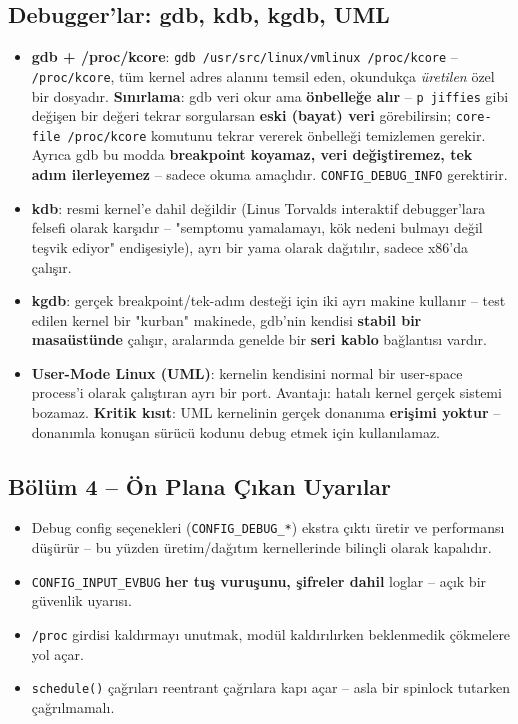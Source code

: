 \documentclass[11pt,a4paper]{article}
\begin{document}
\subsection{Debugger'lar: gdb, kdb, kgdb, UML}

\begin{itemize}[leftmargin=1.2cm]
  \item \textbf{gdb + /proc/kcore}: \texttt{gdb /usr/src/linux/vmlinux
  /proc/kcore} -- \texttt{/proc/kcore}, tüm kernel adres alanını temsil
  eden, okundukça \emph{üretilen} özel bir dosyadır. \textbf{Sınırlama}:
  gdb veri okur ama \textbf{önbelleğe alır} -- \texttt{p jiffies} gibi
  değişen bir değeri tekrar sorgularsan \textbf{eski (bayat) veri}
  görebilirsin; \texttt{core-file /proc/kcore} komutunu tekrar
  vererek önbelleği temizlemen gerekir. Ayrıca gdb bu modda
  \textbf{breakpoint koyamaz, veri değiştiremez, tek adım
  ilerleyemez} -- sadece okuma amaçlıdır. \texttt{CONFIG\_DEBUG\_INFO}
  gerektirir.
  \item \textbf{kdb}: resmi kernel'e dahil değildir (Linus Torvalds
  interaktif debugger'lara felsefi olarak karşıdır -- "semptomu
  yamalamayı, kök nedeni bulmayı değil teşvik ediyor" endişesiyle),
  ayrı bir yama olarak dağıtılır, sadece x86'da çalışır.
  \item \textbf{kgdb}: gerçek breakpoint/tek-adım desteği için iki
  ayrı makine kullanır -- test edilen kernel bir "kurban" makinede,
  gdb'nin kendisi \textbf{stabil bir masaüstünde} çalışır, aralarında
  genelde bir \textbf{seri kablo} bağlantısı vardır.
  \item \textbf{User-Mode Linux (UML)}: kernelin kendisini normal bir
  user-space process'i olarak çalıştıran ayrı bir port. Avantajı:
  hatalı kernel gerçek sistemi bozamaz. \textbf{Kritik kısıt}: UML
  kernelinin gerçek donanıma \textbf{erişimi yoktur} -- donanımla
  konuşan sürücü kodunu debug etmek için kullanılamaz.
\end{itemize}

\subsection*{B\"ol\"um 4 -- \"On Plana \c{C}\i kan Uyar\i lar}
\begin{itemize}[leftmargin=1.2cm]
  \item Debug config seçenekleri (\texttt{CONFIG\_DEBUG\_*}) ekstra
  çıktı üretir ve performansı düşürür -- bu yüzden üretim/dağıtım
  kernellerinde bilinçli olarak kapalıdır.
  \item \texttt{CONFIG\_INPUT\_EVBUG} \textbf{her tuş vuruşunu, şifreler
  dahil} loglar -- açık bir güvenlik uyarısı.
  \item \texttt{/proc} girdisi kaldırmayı unutmak, modül kaldırılırken
  beklenmedik çökmelere yol açar.
  \item \texttt{schedule()} çağrıları reentrant çağrılara kapı açar --
  asla bir spinlock tutarken çağrılmamalı.
\end{itemize}
\end{document}
